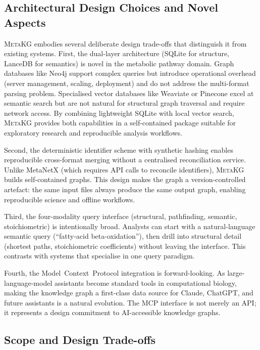 \documentclass[10pt]{article}
\begin{document}
\subsection{Architectural Design Choices and Novel Aspects}

\textsc{MetaKG} embodies several deliberate design trade-offs that distinguish
it from existing systems. First, the dual-layer architecture (SQLite for
structure, LanceDB for semantics) is novel in the metabolic pathway domain.
Graph databases like Neo4j support complex queries but introduce operational
overhead (server management, scaling, deployment) and do not address the
multi-format parsing problem. Specialised vector databases like Weaviate or
Pinecone excel at semantic search but are not natural for structural graph
traversal and require network access. By combining lightweight SQLite with
local vector search, \textsc{MetaKG} provides both capabilities in a
self-contained package suitable for exploratory research and reproducible
analysis workflows.

Second, the deterministic identifier scheme with synthetic hashing enables
reproducible cross-format merging without a centralised reconciliation service.
Unlike MetaNetX (which requires API calls to reconcile identifiers),
\textsc{MetaKG} builds self-contained graphs. This design makes the graph a
version-controlled artefact: the same input files always produce the same
output graph, enabling reproducible science and offline workflows.

Third, the four-modality query interface (structural, pathfinding, semantic,
stoichiometric) is intentionally broad. Analysts can start with a natural-language
semantic query (``fatty-acid beta-oxidation''), then drill into structural detail
(shortest paths, stoichiometric coefficients) without leaving the interface.
This contrasts with systems that specialise in one query paradigm.

Fourth, the Model~Context~Protocol integration is forward-looking. As
large-language-model assistants become standard tools in computational biology,
making the knowledge graph a first-class data source for Claude, ChatGPT, and
future assistants is a natural evolution. The MCP interface is not merely an
API; it represents a design commitment to AI-accessible knowledge graphs.

\subsection{Scope and Design Trade-offs}
\end{document}
